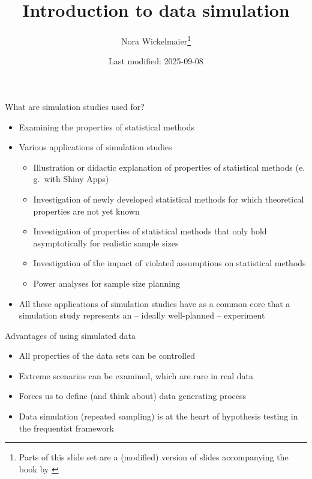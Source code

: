 \documentclass[aspectratio=169]{beamer}
\title{Introduction to data simulation}
\author{Nora Wickelmaier\footnote{Parts of this slide set are a (modified)
version of slides accompanying the book by \citet{Strobl2024}}}
\date{Last modified: 2025-09-08}
\begin{document}
\begin{frame}{}
\thispagestyle{empty}
\titlepage
\end{frame}


\begin{frame}{What are simulation studies used for?}
  \begin{itemize}
    \item Examining the properties of statistical methods
    \item Various applications of simulation studies
      \begin{itemize}
        \item Illustration or didactic explanation of properties of statistical
          methods (e.\,g.\ with Shiny Apps)
        \item Investigation of newly developed statistical methods for which
          theoretical properties are not yet known
        \item Investigation of properties of statistical methods that only hold
          asymptotically for realistic sample sizes
        \item Investigation of the impact of violated assumptions on statistical
          methods
        \item Power analyses for sample size planning
      \end{itemize}
    \item All these applications of simulation studies have as a common core
      that a simulation study represents an -- ideally well-planned --
      experiment
  \end{itemize}
  \vfill
\end{frame}

\begin{frame}{Advantages of using simulated data}
  \begin{itemize}
    \item All properties of the data sets can be controlled
    \item Extreme scenarios can be examined, which are rare in real data
    \item Forces us to define (and think about) data generating process
    \item Data simulation (repeated sampling) is at the heart of hypothesis
      testing in the frequentist framework
  \end{itemize}
  \vfill
\end{frame}
\end{document}
